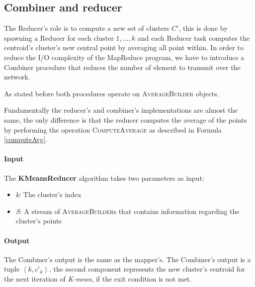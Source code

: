 \documentclass[parskip=full]{report}
\begin{document}
\subsection{Combiner and reducer}
The Reducer's role is to compute a new set of clusters $C'$, this is done by spawning a Reducer for each cluster $1, \dots, k$ and each Reducer task computes the centroid's cluster's new central point by averaging all point 
within. In order to reduce the I/O complexity of the MapReduce program, we have 
to introduce a Combiner procedure that reduces the number of element to 
transmit over the network.

As stated before both procedures operate on \textsc{AverageBuilder} objects.

Fundamentally the reducer's and combiner's implementations are almost the same, 
the only difference is that the reducer computes the average of the points by 
performing the operation \textsc{ComputeAverage} as described in Formula 
\ref{computeAvg}.

\paragraph{Input}

The \textbf{KMeansReducer} algorithm takes two parameters as input:
\begin{itemize}
	\item \textit{k}: The cluster's index
	\item \textit{S}: A stream of \textsc{AverageBuilder}s that contains 
	information regarding the cluster's points
\end{itemize}

\paragraph{Output}

The Combiner's output is the same as the mapper's. The Combiner's output is a 
tuple $\left\langle k, {c'}_k \right\rangle$, the second component represents 
the new cluster's centroid for the next iteration of \emph{K-mean}, if the exit 
condition is not met.

%
\end{document}
